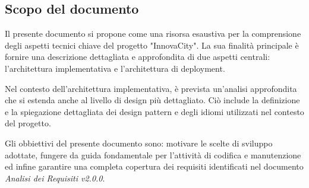 \subsection{Scopo del documento}
Il presente documento si propone come una risorsa esaustiva per la comprensione degli aspetti tecnici chiave del progetto "InnovaCity". La sua finalità principale è fornire una descrizione dettagliata e approfondita di due aspetti centrali: l'architettura implementativa e l'architettura di deployment.

Nel contesto dell'architettura implementativa, è prevista un'analisi approfondita che si estenda anche al livello di design più dettagliato. Ciò include la definizione e la spiegazione dettagliata dei design pattern e degli idiomi utilizzati nel contesto del progetto.

Gli obbiettivi del presente documento sono: motivare le scelte di sviluppo adottate, fungere da guida fondamentale per l'attività di codifica e manutenzione ed infine garantire una completa copertura dei requisiti identificati nel documento \textit{Analisi dei Requisiti v2.0.0}.